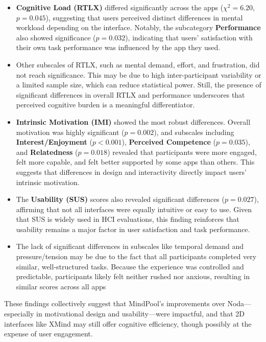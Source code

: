 \documentclass{CPP}
\begin{document}
\begin{itemize}
    \item \textbf{Cognitive Load (RTLX)} differed significantly across the apps ($\chi^2 = 6.20$, $p = 0.045$), suggesting that users perceived distinct differences in mental workload depending on the interface. Notably, the subcategory \textbf{Performance} also showed significance ($p = 0.032$), indicating that users’ satisfaction with their own task performance was influenced by the app they used.
    
    \item Other subscales of RTLX, such as mental demand, effort, and frustration, did not reach significance. This may be due to high inter-participant variability or a limited sample size, which can reduce statistical power. Still, the presence of significant differences in overall RTLX and performance underscores that perceived cognitive burden is a meaningful differentiator.

    \item \textbf{Intrinsic Motivation (IMI)} showed the most robust differences. Overall motivation was highly significant ($p = 0.002$), and subscales including \textbf{Interest/Enjoyment} ($p < 0.001$), \textbf{Perceived Competence} ($p = 0.035$), and \textbf{Relatedness} ($p = 0.018$) revealed that participants were more engaged, felt more capable, and felt better supported by some apps than others. This suggests that differences in design and interactivity directly impact users’ intrinsic motivation.

    \item The \textbf{Usability (SUS)} scores also revealed significant differences ($p = 0.027$), affirming that not all interfaces were equally intuitive or easy to use. Given that SUS is widely used in HCI evaluations, this finding reinforces that usability remains a major factor in user satisfaction and task performance.

    \item The lack of significant differences in subscales like temporal demand and pressure/tension may be due to the fact that all participants completed very similar, well-structured tasks. Because the experience was controlled and predictable, participants likely felt neither rushed nor anxious, resulting in similar scores across all apps
\end{itemize}

These findings collectively suggest that MindPool’s improvements over Noda—especially in motivational design and usability—were impactful, and that 2D interfaces like XMind may still offer cognitive efficiency, though possibly at the expense of user engagement.
\end{document}
